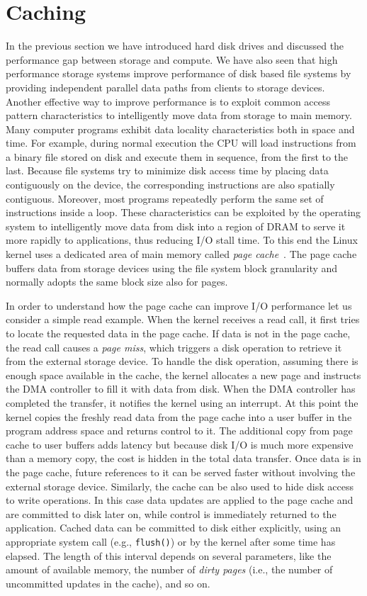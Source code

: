 \section{Caching}\label{section: caching}
In the previous section we have introduced hard disk drives and discussed the performance gap between storage and compute. We have also seen that high performance storage systems improve performance of disk based file systems 
by providing independent parallel data paths from clients to storage devices. Another effective way to improve performance is to exploit common access pattern characteristics to intelligently move data from storage to main memory. 
Many computer programs exhibit data locality characteristics both in space and time. For example, during normal execution the CPU will load instructions from a binary file stored on disk and execute them in sequence, from the first 
to the last. Because file systems try to minimize disk access time by placing data contiguously on the device, the corresponding instructions are also spatially contiguous. Moreover, most programs repeatedly perform the same set of 
instructions inside a loop. These characteristics can be exploited by the operating system to intelligently move data from disk into a region of DRAM to serve it more rapidly to applications, thus reducing I/O stall time. To this 
end the Linux kernel uses a dedicated area of main memory called \textit{page cache}~\cite{Bovet2008}. The page cache buffers data from storage devices using the file system block granularity and normally adopts the same block 
size also for pages.

In order to understand how the page cache can improve I/O performance let us consider a simple read example. When the kernel receives a read call, it first tries to locate the requested data in the page cache. If data is not in the 
page cache, the read call causes a \textit{page miss}, which triggers a disk operation to retrieve it from the external storage device. To handle the disk operation, assuming there is enough space available in the cache, the kernel 
allocates a new page and instructs the DMA controller to fill it with data from disk. When the DMA controller has completed the transfer, it notifies the kernel using an interrupt. At this point the kernel copies the freshly read 
data from the page cache into a user buffer in the program address space and returns control to it. The additional copy from page cache to user buffers adds latency but because disk I/O is much more expensive than a memory copy,
the cost is hidden in the total data transfer. Once data is in the page cache, future references to it can be served faster without involving the external storage device. 
Similarly, the cache can be also used to hide disk access to write operations. In this case data updates are applied to the page cache and are committed to disk later on, while control is immediately returned to the application. 
Cached data can be committed to disk either explicitly, using an appropriate system call (e.g., \texttt{flush()}) or by the kernel after some time has elapsed. The length of this interval depends on several parameters, like the 
amount of available memory, the number of \textit{dirty pages} (i.e., the number of uncommitted updates in the cache), and so on.

